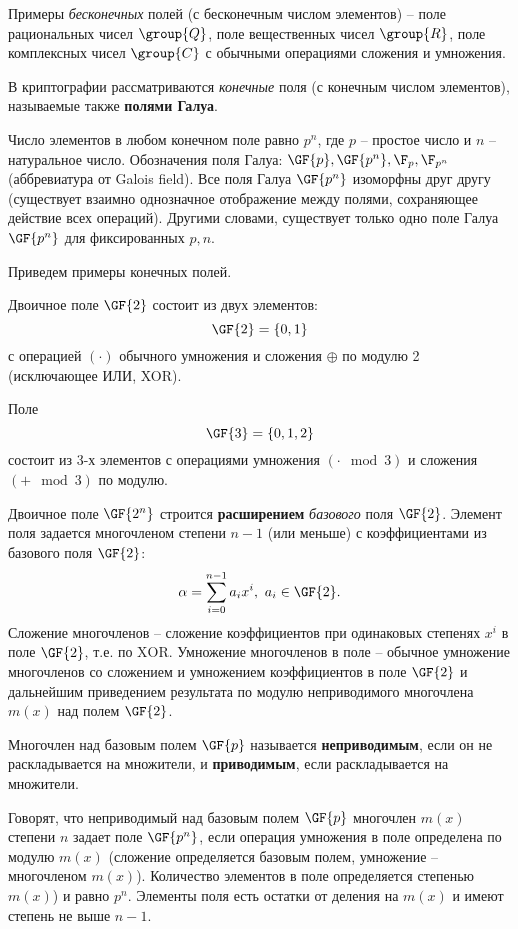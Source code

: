 Примеры \emph{бесконечных} полей (с бесконечным числом элементов) -- поле рациональных чисел $\group{Q}$, поле вещественных чисел $\group{R}$, поле комплексных чисел $\group{C}$ с обычными операциями сложения и умножения.

В криптографии рассматриваются \emph{конечные} поля (с конечным числом элементов), называемые также \textbf{полями Галуа}.

Число элементов в любом конечном поле равно $p^n$, где $p$ -- простое число и $n$ -- натуральное число. Обозначения поля Галуа: $\GF{p}, \GF{p^n}, \F_p, \F_{p^n}$ (аббревиатура от Galois field). Все поля Галуа $\GF{p^n}$ изоморфны друг другу (существует взаимно однозначное отображение между полями, сохраняющее действие всех операций). Другими словами, существует только одно поле Галуа $\GF{p^n}$ для фиксированных $p, n$.

Приведем примеры конечных полей.

Двоичное поле $\GF{2}$ состоит из двух элементов:
    \[ \GF{2} = \{0, 1\} \]
с операцией $(\cdot)$ обычного умножения и сложения  $\oplus$ по модулю 2 (исключающее ИЛИ, XOR).

Поле
    \[ \GF{3} = \{0, 1, 2\} \]
состоит из 3-х элементов с операциями умножения $(\cdot \mod 3)$ и сложения $(+ \mod 3)$ по модулю.

Двоичное поле $\GF{2^n}$ строится \textbf{расширением} \emph{базового} поля $\GF{2}$. Элемент поля задается многочленом степени $n-1$ (или меньше) с коэффициентами из базового поля $\GF{2}$:
    \[ \alpha = \sum\limits_{i=0}^{n-1} a_i x^i, ~ a_i \in \GF{2}. \]
Сложение многочленов -- сложение коэффициентов при одинаковых степенях $x^i$ в поле $\GF{2}$, т.е. по $\text{XOR}$. Умножение многочленов в поле -- обычное умножение многочленов со сложением и умножением коэффициентов в поле $\GF{2}$ и дальнейшим приведением результата по модулю неприводимого многочлена $m(x)$ над полем $\GF{2}$.

Многочлен над базовым полем $\GF{p}$ называется \textbf{неприводимым}, если он не раскладывается на множители, и \textbf{приводимым}, если раскладывается на множители.

Говорят, что неприводимый над базовым полем $\GF{p}$ многочлен $m(x)$ степени $n$ задает поле $\GF{p^n}$, если операция умножения в поле определена по модулю $m(x)$ (сложение определяется базовым полем, умножение -- многочленом $m(x)$). Количество элементов в поле определяется степенью $m(x)$) и равно $p^n$. Элементы поля есть остатки от деления на $m(x)$ и имеют степень не выше $n-1$.

